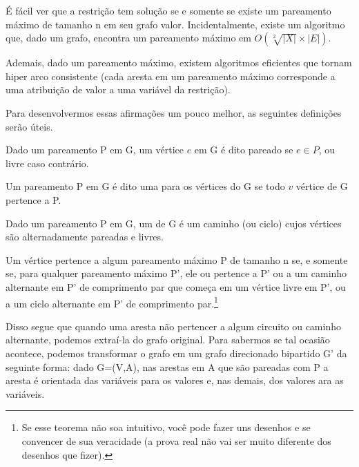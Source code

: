 \documentclass{article}
\begin{document}
É fácil ver que a restrição  tem solução se e
somente se existe um pareamento máximo de tamanho n em seu grafo
valor. Incidentalmente, existe um algoritmo que, dado um grafo,
encontra um pareamento máximo em $O(\sqrt[2]{|X|}\times|E|)$.

Ademais, dado um pareamento máximo, existem algoritmos eficientes que
tornam  hiper arco consistente (cada aresta em
um pareamento máximo corresponde a uma atribuição de valor a uma
variável da restrição).

Para desenvolvermos essas afirmações um pouco melhor, as seguintes
definições serão úteis.

\begin{definition}
  Dado um pareamento P em G, um vértice $e$ em G é dito pareado se
  $e\in P$, ou livre caso contrário.
\end{definition}

\begin{definition}
  Um pareamento P em G é dito uma  para os
  vértices do G se todo $v$ vértice de G pertence a P.
\end{definition}

\begin{definition}
  Dado um pareamento P em G, um  de G é um caminho (ou ciclo) cujos vértices são
  alternadamente pareadas e livres.
\end{definition}

\begin{theorem}
  Um vértice pertence a algum pareamento máximo P de tamanho n se, e
  somente se, para qualquer pareamento máximo P', ele ou pertence a P'
  ou a um caminho alternante em P' de comprimento par que começa em um
  vértice livre em P', ou a um ciclo alternante em P' de comprimento
  par.\footnote{Se esse teorema não soa intuitivo, você pode fazer uns
    desenhos e se convencer de sua veracidade (a prova real não vai
    ser muito diferente dos desenhos que fizer).}
\end{theorem}

Disso segue que quando uma aresta não pertencer a algum circuito ou
caminho alternante, podemos extraí-la do grafo original.  Para
sabermos se tal ocasião acontece, podemos transformar o grafo em um
grafo direcionado bipartido G' da seguinte forma: dado G=(V,A), nas
arestas em A que são pareadas com P a aresta é orientada das variáveis
para os valores e, nas demais, dos valores ara as variáveis.
\end{document}
